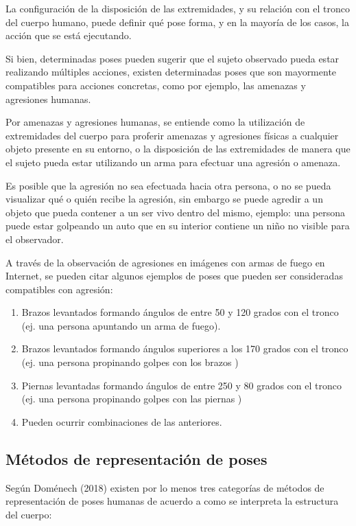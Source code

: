 \documentclass[a4paper,12pt,oneside,spanish]{book}
\begin{document}
La configuración de la disposición de las extremidades, y su relación con el tronco del cuerpo humano, puede definir qué pose forma, y en la mayoría de los casos, la acción que se está ejecutando. \par

Si bien, determinadas poses pueden sugerir que el sujeto observado pueda estar realizando múltiples acciones, existen determinadas poses que son mayormente compatibles para acciones concretas, como por ejemplo, las amenazas y agresiones humanas.\par

Por amenazas y agresiones humanas, se entiende como la utilización de extremidades del cuerpo para proferir amenazas y agresiones físicas a cualquier objeto presente en su entorno, o la disposición de las extremidades de manera que el sujeto pueda estar utilizando un arma para efectuar una agresión o amenaza. \par 

Es posible que la agresión no sea efectuada hacia otra persona, o no se pueda visualizar qué o quién recibe la agresión, sin embargo se puede agredir a un objeto que pueda contener a un ser vivo dentro del mismo, ejemplo: una persona puede estar golpeando un auto que en su interior contiene un niño no visible para el observador.\par

A través de la observación de agresiones en imágenes con armas de fuego en Internet, se pueden citar algunos ejemplos de poses que pueden ser consideradas compatibles con agresión:

\begin{enumerate}
	\baselineskip 16pt
	\item Brazos levantados formando ángulos de entre 50 y 120 grados con el tronco (ej. una persona apuntando un arma de fuego). 
	\item Brazos levantados formando ángulos superiores a los 170 grados con el tronco (ej. una persona propinando golpes con los brazos ) 
	\item Piernas levantadas formando ángulos de entre 250 y 80 grados con el tronco  (ej. una persona propinando golpes con las piernas ) 
	\item Pueden ocurrir combinaciones de las anteriores.
\end{enumerate}

\subsection{Métodos de representación de poses}
Según Doménech (2018) existen por lo menos tres categorías de métodos de representación de poses humanas de acuerdo a como se interpreta la estructura del cuerpo:
\end{document}
